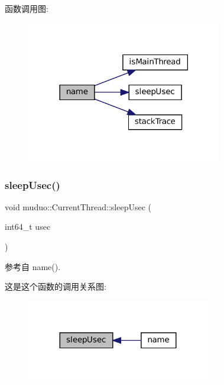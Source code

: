 函数调用图\+:
\nopagebreak
\begin{figure}[H]
\begin{center}
\leavevmode
\includegraphics[width=242pt]{namespacemuduo_1_1CurrentThread_adc8b0cfe3a876d8edf272f982ea2c014_cgraph}
\end{center}
\end{figure}
\mbox{\label{namespacemuduo_1_1CurrentThread_ab625c2286c356d09b66b9ab043946fd1}} 
\subsubsection{\texorpdfstring{sleep\+Usec()}{sleepUsec()}}
{\footnotesize\ttfamily void muduo\+::\+Current\+Thread\+::sleep\+Usec (\begin{DoxyParamCaption}\item[{int64\+\_\+t}]{usec }\end{DoxyParamCaption})}



参考自 name().

这是这个函数的调用关系图\+:
\nopagebreak
\begin{figure}[H]
\begin{center}
\leavevmode
\includegraphics[width=227pt]{namespacemuduo_1_1CurrentThread_ab625c2286c356d09b66b9ab043946fd1_icgraph}
\end{center}
\end{figure}
\mbox{\label{namespacemuduo_1_1CurrentThread_adb3a86b79370bd58610e2b8942980edf}} 
